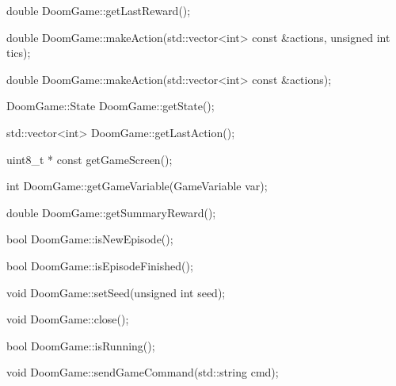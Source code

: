 \begin{clinee}
	double DoomGame::getLastReward();
\end{clinee}


\begin{clinee}
	double DoomGame::makeAction(std::vector<int> const &actions, unsigned int tics);
\end{clinee}

   
\begin{clinee}
	double DoomGame::makeAction(std::vector<int> const &actions);
\end{clinee}


\begin{clinee}
	DoomGame::State DoomGame::getState();
\end{clinee}


\begin{clinee}
	std::vector<int> DoomGame::getLastAction();
\end{clinee}


\begin{clinee}
	uint8_t * const getGameScreen();
\end{clinee}


\begin{clinee}
	int DoomGame::getGameVariable(GameVariable var);
\end{clinee}


\begin{clinee}
	double DoomGame::getSummaryReward();
\end{clinee}


\begin{clinee}
	bool DoomGame::isNewEpisode();
\end{clinee}


\begin{clinee}
	bool DoomGame::isEpisodeFinished();
\end{clinee}


\begin{clinee}
	void DoomGame::setSeed(unsigned int seed);
\end{clinee}


\begin{clinee}
	void DoomGame::close();
\end{clinee}


\begin{clinee}
	bool DoomGame::isRunning();
\end{clinee}


\begin{clinee}
	void DoomGame::sendGameCommand(std::string cmd);
\end{clinee}


